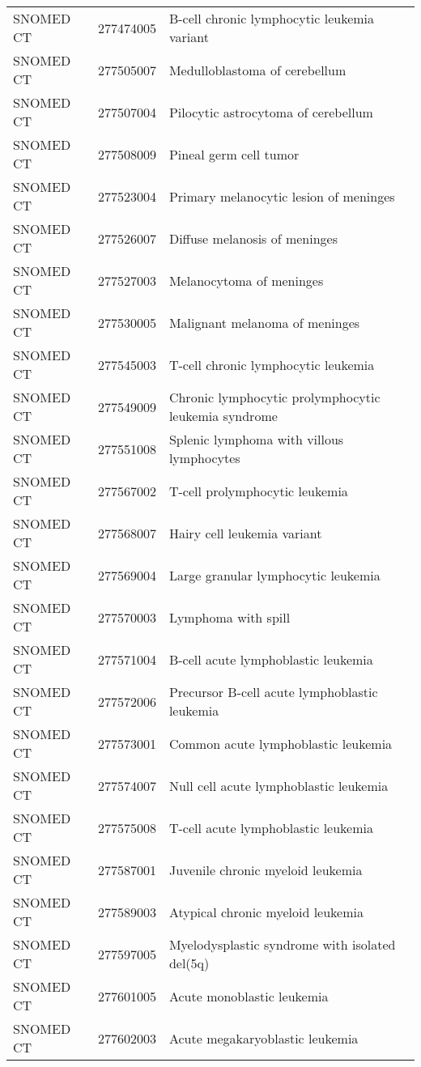 \begin{longtable}{p{}p{}p{}}
  SNOMED CT & 277474005 & B-cell chronic lymphocytic leukemia variant \\ 
  SNOMED CT & 277505007 & Medulloblastoma of cerebellum \\ 
  SNOMED CT & 277507004 & Pilocytic astrocytoma of cerebellum \\ 
  SNOMED CT & 277508009 & Pineal germ cell tumor \\ 
  SNOMED CT & 277523004 & Primary melanocytic lesion of meninges \\ 
  SNOMED CT & 277526007 & Diffuse melanosis of meninges \\ 
  SNOMED CT & 277527003 & Melanocytoma of meninges \\ 
  SNOMED CT & 277530005 & Malignant melanoma of meninges \\ 
  SNOMED CT & 277545003 & T-cell chronic lymphocytic leukemia \\ 
  SNOMED CT & 277549009 & Chronic lymphocytic prolymphocytic leukemia syndrome \\ 
  SNOMED CT & 277551008 & Splenic lymphoma with villous lymphocytes \\ 
  SNOMED CT & 277567002 & T-cell prolymphocytic leukemia \\ 
  SNOMED CT & 277568007 & Hairy cell leukemia variant \\ 
  SNOMED CT & 277569004 & Large granular lymphocytic leukemia \\ 
  SNOMED CT & 277570003 & Lymphoma with spill \\ 
  SNOMED CT & 277571004 & B-cell acute lymphoblastic leukemia \\ 
  SNOMED CT & 277572006 & Precursor B-cell acute lymphoblastic leukemia \\ 
  SNOMED CT & 277573001 & Common acute lymphoblastic leukemia \\ 
  SNOMED CT & 277574007 & Null cell acute lymphoblastic leukemia \\ 
  SNOMED CT & 277575008 & T-cell acute lymphoblastic leukemia \\ 
  SNOMED CT & 277587001 & Juvenile chronic myeloid leukemia \\ 
  SNOMED CT & 277589003 & Atypical chronic myeloid leukemia \\ 
  SNOMED CT & 277597005 & Myelodysplastic syndrome with isolated del(5q) \\ 
  SNOMED CT & 277601005 & Acute monoblastic leukemia \\ 
  SNOMED CT & 277602003 & Acute megakaryoblastic leukemia \\ 

\end{longtable}
